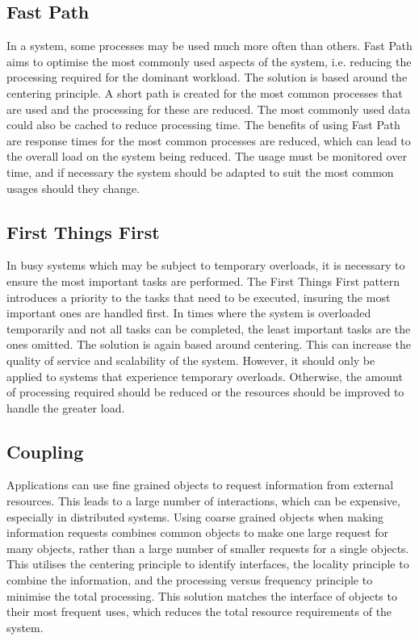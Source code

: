 \documentclass[a4paper,11pt,article,oneside]{memoir}
\begin{document}
	\subsection{Fast Path}
	In a system, some processes may be used much more often than others. Fast Path aims to optimise the most commonly used aspects of the system, i.e. reducing the processing required for the dominant workload. The solution is based around the centering principle. A short path is created for the most common processes that are used and the processing for these are reduced. The most commonly used data could also be cached to reduce processing time. The benefits of using Fast Path are response times for the most common processes are reduced, which can lead to the overall load on the system being reduced. The usage must be monitored over time, and if necessary the system should be adapted to suit the most common usages should they change.
	
	\subsection{First Things First}
	In busy systems which may be subject to temporary overloads, it is necessary to ensure the most important tasks are performed. The First Things First pattern introduces a priority to the tasks that need to be executed, insuring the most important ones are handled first. In times where the system is overloaded temporarily and not all tasks can be completed, the least important tasks are the ones omitted. The solution is again based around centering. This can increase the quality of service and scalability of the system. However, it should only be applied to systems that experience temporary overloads. Otherwise, the amount of processing required should be reduced or the resources should be improved to handle the greater load.
	
	\subsection{Coupling}
	Applications can use fine grained objects to request information from external resources. This leads to a large number of interactions, which can be expensive, especially in distributed systems. Using coarse grained objects when making information requests combines common objects to make one large request for many objects, rather than a large number of  smaller requests for a single objects. This utilises the centering principle to identify interfaces, the locality principle to combine the information, and the processing versus frequency principle to minimise the total processing. This solution matches the interface of objects to their most frequent uses, which reduces the total resource requirements of the system. 
	
\end{document}
